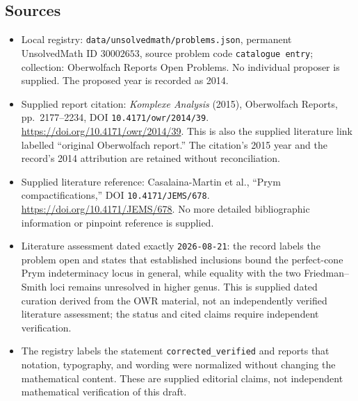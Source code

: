 \documentclass[11pt]{article}
\begin{document}
\subsection{Sources}
\begin{itemize}
\item Local registry: \texttt{data/unsolvedmath/problems.json}, permanent UnsolvedMath ID \(30002653\), source problem code \texttt{catalogue entry}; collection: Oberwolfach Reports Open Problems. No individual proposer is supplied. The proposed year is recorded as 2014.
\item Supplied report citation: \emph{Komplexe Analysis} (2015), Oberwolfach Reports, pp.~2177--2234, DOI \texttt{10.4171/owr/2014/39}. \url{https://doi.org/10.4171/owr/2014/39}. This is also the supplied literature link labelled ``original Oberwolfach report.'' The citation's 2015 year and the record's 2014 attribution are retained without reconciliation.
\item Supplied literature reference: Casalaina-Martin et al., ``Prym compactifications,'' DOI \texttt{10.4171/JEMS/678}. \url{https://doi.org/10.4171/JEMS/678}. No more detailed bibliographic information or pinpoint reference is supplied.
\item Literature assessment dated exactly \texttt{2026-08-21}: the record labels the problem open and states that established inclusions bound the perfect-cone Prym indeterminacy locus in general, while equality with the two Friedman--Smith loci remains unresolved in higher genus. This is supplied dated curation derived from the OWR material, not an independently verified literature assessment; the status and cited claims require independent verification.
\item The registry labels the statement \texttt{corrected\_verified} and reports that notation, typography, and wording were normalized without changing the mathematical content. These are supplied editorial claims, not independent mathematical verification of this draft.
\end{itemize}
\end{document}
